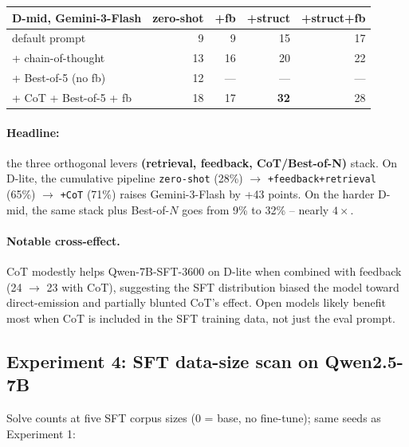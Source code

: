 \documentclass[11pt]{article}
\begin{document}
\begin{center}\small
\begin{tabular}{lrrrr}
\toprule
\textbf{D-mid, Gemini-3-Flash} & \textbf{zero-shot} & \textbf{+fb} & \textbf{+struct} & \textbf{+struct+fb} \\
\midrule
default prompt              & 9 & 9 & 15 & 17 \\
+ chain-of-thought          & 13 & 16 & 20 & 22 \\
+ Best-of-5 (no fb)         & 12 & --- & --- & --- \\
+ CoT + Best-of-5 + fb      & 18 & 17 & \textbf{32} & 28 \\
\bottomrule
\end{tabular}
\end{center}

\paragraph{Headline:} the three orthogonal levers \textbf{(retrieval, feedback, CoT/Best-of-N)} stack. On D-lite, the cumulative pipeline
\texttt{zero-shot} (28\%) $\to$ \texttt{+feedback+retrieval} (65\%) $\to$
\texttt{+CoT} (71\%) raises Gemini-3-Flash by +43 points. On the harder
D-mid, the same stack plus Best-of-$N$ goes from 9\% to 32\% -- nearly $4\times$.

\paragraph{Notable cross-effect.} CoT modestly helps Qwen-7B-SFT-3600 on D-lite
when combined with feedback (24 $\to$ 23 with CoT), suggesting the SFT
distribution biased the model toward direct-emission and partially blunted
CoT's effect. Open models likely benefit most when CoT is included in the
SFT training data, not just the eval prompt.

\subsection{Experiment 4: SFT data-size scan on Qwen2.5-7B}

Solve counts at five SFT corpus sizes (0 = base, no fine-tune); same seeds as Experiment 1:
\end{document}
